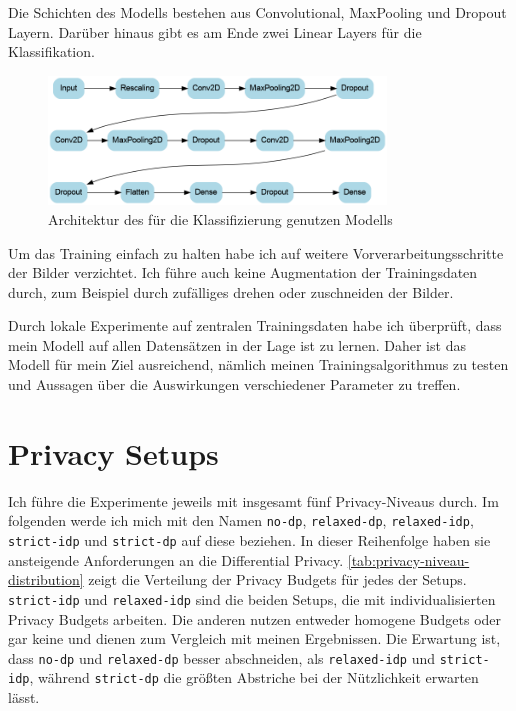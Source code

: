 Die Schichten des Modells bestehen aus Convolutional, MaxPooling und Dropout Layern. Darüber hinaus gibt es am Ende zwei Linear Layers für die Klassifikation.

\begin{figure}[tb]
	\centering
	\includegraphics[width=0.8\textwidth]{Bilder/model_architecture_1.png}
	\caption{Architektur des für die Klassifizierung genutzen Modells}
	\label{fig:model-architecture}
\end{figure}

Um das Training einfach zu halten habe ich auf weitere Vorverarbeitungsschritte der Bilder verzichtet. Ich führe auch keine Augmentation der Trainingsdaten durch, zum Beispiel durch zufälliges drehen oder zuschneiden der Bilder.

Durch lokale Experimente auf zentralen Trainingsdaten habe ich überprüft, dass mein Modell auf allen Datensätzen in der Lage ist zu lernen. Daher ist das Modell für mein Ziel ausreichend, nämlich meinen Trainingsalgorithmus zu testen und Aussagen über die Auswirkungen verschiedener Parameter zu treffen.

\section{Privacy Setups}
Ich führe die Experimente jeweils mit insgesamt fünf Privacy-Niveaus durch. Im folgenden werde ich mich mit den Namen \texttt{no-dp}, \texttt{relaxed-dp}, \texttt{relaxed-idp}, \texttt{strict-idp} und \texttt{strict-dp} auf diese beziehen. In dieser Reihenfolge haben sie ansteigende Anforderungen an die Differential Privacy. \autoref{tab:privacy-niveau-distribution} zeigt die Verteilung der Privacy Budgets für jedes der Setups. \texttt{strict-idp} und \texttt{relaxed-idp} sind die beiden Setups, die mit individualisierten Privacy Budgets arbeiten. Die anderen nutzen entweder homogene Budgets oder gar keine und dienen zum Vergleich mit meinen Ergebnissen. Die Erwartung ist, dass \texttt{no-dp} und \texttt{relaxed-dp} besser abschneiden, als \texttt{relaxed-idp} und \texttt{strict-idp}, während \texttt{strict-dp} die größten Abstriche bei der Nützlichkeit erwarten lässt.

